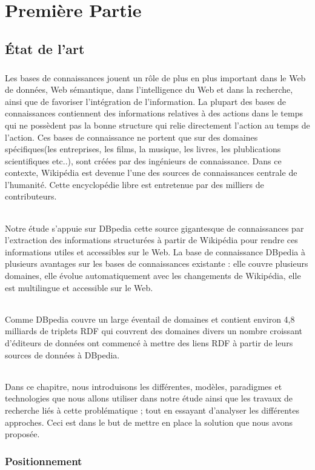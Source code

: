 \documentclass[12pt,a4]{report}
\begin{document}
\chapter{Première Partie}
\section{État de l'art}
\paragraph{}
Les bases de connaissances jouent un rôle de plus en plus important dans le Web de données, Web sémantique, dans l'intelligence du Web et dans la recherche, ainsi que de favoriser l'intégration de l'information. La plupart des bases de connaissances contiennent des informations relatives à des actions dans le temps qui ne possèdent pas la bonne structure qui relie directement l'action au temps de l'action.
Ces bases de connaissance ne portent que sur des domaines spécifiques(les entreprises, les films, la musique, les livres, les plublications scientifiques etc..), sont créées par des ingénieurs de connaissance. Dans ce contexte, Wikipédia est devenue l'une des sources de connaissances centrale de l'humanité. Cette encyclopédie libre est entretenue par des milliers de contributeurs.
\subparagraph{}
Notre étude s'appuie sur DBpedia cette source gigantesque de connaissances par l'extraction des informations structurées à partir de Wikipédia pour rendre ces informations utiles et accessibles sur le Web. La base de connaissance DBpedia à plusieurs avantages sur les bases de connaissances existante : elle couvre plusieurs domaines, elle évolue automatiquement avec les changements de Wikipédia, elle est multilingue et accessible sur le Web. 
\subparagraph{}
Comme DBpedia couvre un large éventail de domaines et contient environ 4,8 milliards de triplets RDF qui couvrent des domaines divers un nombre croissant d'éditeurs de données ont commencé à mettre des liens RDF à partir de leurs sources de données à DBpedia.
\subparagraph{}
Dans ce chapitre, nous introduisons les différentes, modèles, paradigmes et technologies que nous allons utiliser dans notre étude ainsi que les travaux de recherche liés à cette problématique ; tout en essayant d'analyser les différentes approches. Ceci est dans le but de mettre en place la solution que nous avons proposée.
\subsection{Positionnement}
\end{document}
